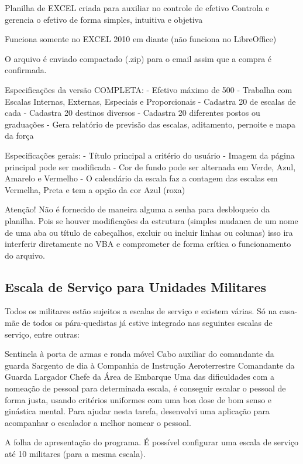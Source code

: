 Planilha de EXCEL criada para auxiliar no controle de efetivo
Controla e gerencia o efetivo de forma simples, intuitiva e objetiva

Funciona somente no EXCEL 2010 em diante (não funciona no LibreOffice)

O arquivo é enviado compactado (.zip) para o email assim que a compra é confirmada.

Especificações da versão COMPLETA:
- Efetivo máximo de 500
- Trabalha com Escalas Internas, Externas, Especiais e Proporcionais
- Cadastra 20 de escalas de cada
- Cadastra 20 destinos diversos
- Cadastra 20 diferentes postos ou graduações
- Gera relatório de previsão das escalas, aditamento, pernoite e mapa da força

Especificações gerais:
- Título principal a critério do usuário
- Imagem da página principal pode ser modificada
- Cor de fundo pode ser alternada em Verde, Azul, Amarelo e Vermelho
- O calendário da escala faz a contagem das escalas em Vermelha, Preta e tem a opção da cor Azul (roxa)

Atenção!
Não é fornecido de maneira alguma a senha para desbloqueio da planilha. Pois se houver modificações da estrutura (simples mudanca de um nome de uma aba ou título de cabeçalhos, excluir ou incluir linhas ou colunas) isso ira interferir diretamente no VBA e comprometer de forma crítica o funcionamento do arquivo.\citep{planilha}

\subsection{Escala de Serviço para Unidades Militares}
Todos os militares estão sujeitos a escalas de serviço e existem várias. Só na casa-mãe de todos os pára-quedistas já estive integrado nas seguintes escalas de serviço, entre outras:

Sentinela à porta de armas e ronda móvel
Cabo auxiliar do comandante da guarda
Sargento de dia à Companhia de Instrução Aeroterrestre
Comandante da Guarda
Largador
Chefe da Área de Embarque
Uma das dificuldades com a nomeação de pessoal para determinada escala, é conseguir escalar o pessoal de forma justa, usando critérios uniformes com uma boa dose de bom senso e ginástica mental. Para ajudar nesta tarefa, desenvolvi uma aplicação para acompanhar o escalador a melhor nomear o pessoal.

A folha de apresentação do programa. É possível configurar uma escala de serviço até 10 militares (para a mesma escala).

